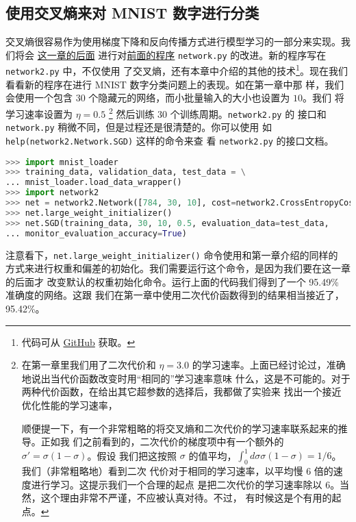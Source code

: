 \subsection{使用交叉熵来对 MNIST 数字进行分类}

交叉熵很容易作为使用梯度下降和反向传播方式进行模型学习的一部分来实现。我们将会%
\hyperref[sec:handwriting_recognition_revisited_the_code]{这一章的后面}%
进行对\hyperref[sec:implementing_our_network_to_classify_digits]{前面的程序}
\lstinline!network.py! 的改进。新的程序写在 \lstinline!network2.py!  中，不仅使用
了交叉熵，还有本章中介绍的其他的技术\footnote{代码可从%
  \href{https://github.com/mnielsen/neural-networks-and-deep-learning/blob/master/src/network2.py}{GitHub}
  获取。}。现在我们看看新的程序在进行 MNIST 数字分类问题上的表现。如在第一章中那
样，我们会使用一个包含 $30$ 个隐藏元的网络，而小批量输入的大小也设置为 $10$。我们
将学习速率设置为 $\eta=0.5$ \footnote{ 在第一章里我们用了二次代价和 $\eta = 3.0$
  的学习速率。上面已经讨论过，准确地说出当代价函数改变时用``相同的''学习速率意味
  什么，这是不可能的。对于两种代价函数，在给出其它超参数的选择后，我都做了实验来
  找出一个接近优化性能的学习速率，

  顺便提一下，有一个非常粗略的将交叉熵和二次代价的学习速率联系起来的推导。正如我
  们之前看到的，二次代价的梯度项中有一个额外的 $\sigma' = \sigma(1-\sigma)$。假设
  我们把这按照 $\sigma$
  的值平均，$\int_0^1 d\sigma \sigma(1-\sigma) = 1/6$。我们（非常粗略地）看到二次
  代价对于相同的学习速率，以平均慢 $6$ 倍的速度进行学习。这提示我们一个合理的起点
  是把二次代价的学习速率除以 $6$。当然，这个理由非常不严谨，不应被认真对待。不过，
  有时候这是个有用的起点。} 然后训练 $30$ 个训练周期。\lstinline!network2.py! 的
接口和 \lstinline!network.py! 稍微不同，但是过程还是很清楚的。你可以使用
如 \lstinline!help(network2.Network.SGD)! 这样的命令来查
看 \lstinline!network2.py! 的接口文档。

\begin{lstlisting}[language=Python]
>>> import mnist_loader
>>> training_data, validation_data, test_data = \
... mnist_loader.load_data_wrapper()
>>> import network2
>>> net = network2.Network([784, 30, 10], cost=network2.CrossEntropyCost)
>>> net.large_weight_initializer()
>>> net.SGD(training_data, 30, 10, 0.5, evaluation_data=test_data,
... monitor_evaluation_accuracy=True)
\end{lstlisting}

注意看下，\lstinline!net.large_weight_initializer()! 命令使用和第一章介绍的同样的
方式来进行权重和偏差的初始化。我们需要运行这个命令，是因为我们要在这一章的后面才
改变默认的权重初始化命令。运行上面的代码我们得到了一个 95.49\% 准确度的网络。这跟
我们在第一章中使用二次代价函数得到的结果相当接近了，95.42\%。


